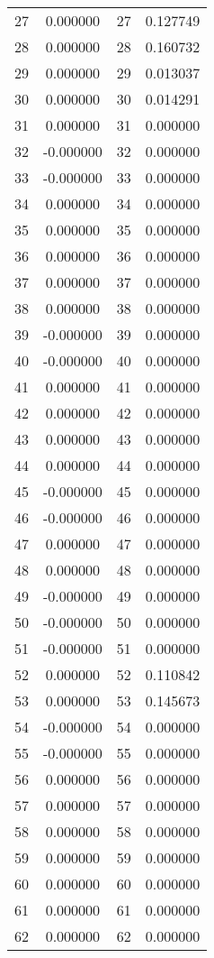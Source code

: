 \documentclass[12pt]{article}
\begin{document}
\begin{longtable}{@{}cccc@{}}
27 & 0.000000 & 27 & 0.127749 \\
28 & 0.000000 & 28 & 0.160732 \\
29 & 0.000000 & 29 & 0.013037 \\
30 & 0.000000 & 30 & 0.014291 \\
31 & 0.000000 & 31 & 0.000000 \\
32 & -0.000000 & 32 & 0.000000 \\
33 & -0.000000 & 33 & 0.000000 \\
34 & 0.000000 & 34 & 0.000000 \\
35 & 0.000000 & 35 & 0.000000 \\
36 & 0.000000 & 36 & 0.000000 \\
37 & 0.000000 & 37 & 0.000000 \\
38 & 0.000000 & 38 & 0.000000 \\
39 & -0.000000 & 39 & 0.000000 \\
40 & -0.000000 & 40 & 0.000000 \\
41 & 0.000000 & 41 & 0.000000 \\
42 & 0.000000 & 42 & 0.000000 \\
43 & 0.000000 & 43 & 0.000000 \\
44 & 0.000000 & 44 & 0.000000 \\
45 & -0.000000 & 45 & 0.000000 \\
46 & -0.000000 & 46 & 0.000000 \\
47 & 0.000000 & 47 & 0.000000 \\
48 & 0.000000 & 48 & 0.000000 \\
49 & -0.000000 & 49 & 0.000000 \\
50 & -0.000000 & 50 & 0.000000 \\
51 & -0.000000 & 51 & 0.000000 \\
52 & 0.000000 & 52 & 0.110842 \\
53 & 0.000000 & 53 & 0.145673 \\
54 & -0.000000 & 54 & 0.000000 \\
55 & -0.000000 & 55 & 0.000000 \\
56 & 0.000000 & 56 & 0.000000 \\
57 & 0.000000 & 57 & 0.000000 \\
58 & 0.000000 & 58 & 0.000000 \\
59 & 0.000000 & 59 & 0.000000 \\
60 & 0.000000 & 60 & 0.000000 \\
61 & 0.000000 & 61 & 0.000000 \\
62 & 0.000000 & 62 & 0.000000 \\

\end{longtable}
\end{document}
